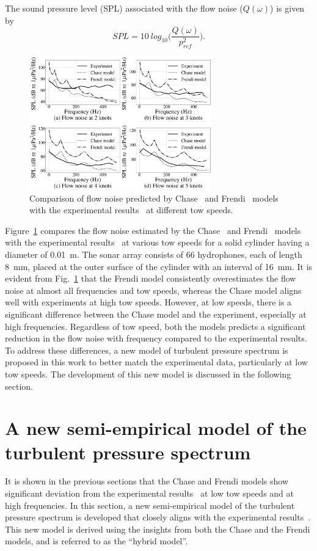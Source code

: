 \documentclass[twocolumn,10pt]{asme2ej}
\begin{document}
The sound pressure level (SPL) associated with the flow noise ($Q(\omega)$) is given by
\begin{equation}\label{SPL outside noise}
SPL = 10~log_{10}\bigg(\frac{Q(\omega)}{p_{ref}^2}\bigg).
\end{equation}
\begin{figure}[h]
    \centering
    \includegraphics[width=3.1in]{figure/Chase,frendi_vs_Unni_comparison.eps}
    \caption{Comparison of flow noise predicted by Chase~\cite{Chase1981} and Frendi~\cite{frendi2020} models with the experimental results~\cite{Unni2011} at different tow speeds.}
    \label{Chase,frendi,expt}
\end{figure}

Figure~\ref{Chase,frendi,expt} compares the flow noise estimated by the Chase~\cite{Chase1981} and Frendi~\cite{frendi2020} models with the experimental results~\cite{Unni2011} at various tow speeds for a solid cylinder having a diameter of 0.01~m. The sonar array consists of 66 hydrophones, each of length 8~mm, placed at the outer surface of the cylinder with an interval of 16~mm. It is evident from Fig.~\ref{Chase,frendi,expt} that the Frendi model consistently overestimates the flow noise at almost all frequencies and tow speeds, whereas the Chase model aligns well with experiments at high tow speeds. However, at low speeds, there is a significant difference between the Chase model and the experiment, especially at high frequencies. Regardless of tow speed, both the models predicts a significant reduction in the flow noise with frequency compared to the experimental results. To address these differences, a new model of turbulent pressure spectrum is proposed in this work to better match the experimental data, particularly at low tow speeds. The development of this new model is discussed in the following section.

\section{A new semi-empirical model of the turbulent pressure spectrum}\label{sec:hybmodel}
It is shown in the previous sections that the Chase and Frendi models show significant deviation from the experimental results~\cite{Unni2011} at low tow speeds and at high frequencies. In this section, a new semi-empirical model of the turbulent pressure spectrum is developed that closely aligns with the experimental results~\cite{Unni2011}. This new model is derived using the insights from both the Chase and the Frendi models, and is referred to as the \enquote{hybrid model}.
\end{document}
